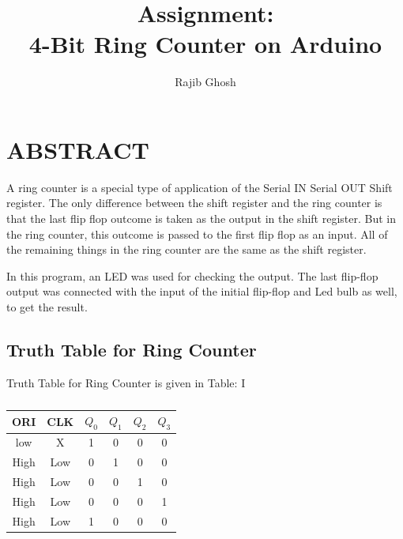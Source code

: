 \documentclass[conference]{IEEEtran}
\title{
\vspace{1cm}
{Assignment:
\\4-Bit Ring Counter on Arduino}
}
\author{Rajib Ghosh}
\begin{document}
\maketitle
\section{ABSTRACT}
A ring counter is a special type of application of the Serial IN Serial OUT Shift register. The only difference between the shift register and the ring counter is that the last flip flop outcome is taken as the output in the shift register. But in the ring counter, this outcome is passed to the first flip flop as an input. All of the remaining things in the ring counter are the same as the shift register.

In this program, an LED was used for checking the output. The last flip-flop output was connected with the input of the initial flip-flop and Led bulb as well, to get the result.

\subsection{Truth Table for Ring Counter}
Truth Table for Ring Counter is given in Table: I
\begin{table}[htbp]
    \centering
\begin{tabular}{ | c | c | c | c | c | c | } \hline
ORI  & CLK & $Q_0$ & $Q_1$ & $Q_2$ & $Q_3$ \\\hline
low  & X   & 1 & 0 & 0 & 0 \\
High & Low & 0 & 1 & 0 & 0 \\
High & Low & 0 & 0 & 1 & 0 \\
High & Low & 0 & 0 & 0 & 1 \\
High & Low & 1 & 0 & 0 & 0 \\ \hline
\end{tabular}
\vspace{0.1cm}
\caption{\label{tab:widgets}}
\end{table}
\end{document}
